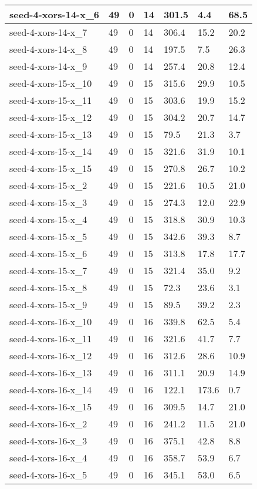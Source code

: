 \begin{scriptsize}
\begin{longtable}{|p{5cm}|l|l|l|l|l|l|}
seed-4-xors-14-x\_6&49&0&14&301.5&4.4&68.5 \\ \hline 
seed-4-xors-14-x\_7&49&0&14&306.4&15.2&20.2 \\ \hline 
seed-4-xors-14-x\_8&49&0&14&197.5&7.5&26.3 \\ \hline 
seed-4-xors-14-x\_9&49&0&14&257.4&20.8&12.4 \\ \hline 
seed-4-xors-15-x\_10&49&0&15&315.6&29.9&10.5 \\ \hline 
seed-4-xors-15-x\_11&49&0&15&303.6&19.9&15.2 \\ \hline 
seed-4-xors-15-x\_12&49&0&15&304.2&20.7&14.7 \\ \hline 
seed-4-xors-15-x\_13&49&0&15&79.5&21.3&3.7 \\ \hline 
seed-4-xors-15-x\_14&49&0&15&321.6&31.9&10.1 \\ \hline 
seed-4-xors-15-x\_15&49&0&15&270.8&26.7&10.2 \\ \hline 
seed-4-xors-15-x\_2&49&0&15&221.6&10.5&21.0 \\ \hline 
seed-4-xors-15-x\_3&49&0&15&274.3&12.0&22.9 \\ \hline 
seed-4-xors-15-x\_4&49&0&15&318.8&30.9&10.3 \\ \hline 
seed-4-xors-15-x\_5&49&0&15&342.6&39.3&8.7 \\ \hline 
seed-4-xors-15-x\_6&49&0&15&313.8&17.8&17.7 \\ \hline 
seed-4-xors-15-x\_7&49&0&15&321.4&35.0&9.2 \\ \hline 
seed-4-xors-15-x\_8&49&0&15&72.3&23.6&3.1 \\ \hline 
seed-4-xors-15-x\_9&49&0&15&89.5&39.2&2.3 \\ \hline 
seed-4-xors-16-x\_10&49&0&16&339.8&62.5&5.4 \\ \hline 
seed-4-xors-16-x\_11&49&0&16&321.6&41.7&7.7 \\ \hline 
seed-4-xors-16-x\_12&49&0&16&312.6&28.6&10.9 \\ \hline 
seed-4-xors-16-x\_13&49&0&16&311.1&20.9&14.9 \\ \hline 
seed-4-xors-16-x\_14&49&0&16&122.1&173.6&0.7 \\ \hline 
seed-4-xors-16-x\_15&49&0&16&309.5&14.7&21.0 \\ \hline 
seed-4-xors-16-x\_2&49&0&16&241.2&11.5&21.0 \\ \hline 
seed-4-xors-16-x\_3&49&0&16&375.1&42.8&8.8 \\ \hline 
seed-4-xors-16-x\_4&49&0&16&358.7&53.9&6.7 \\ \hline 
seed-4-xors-16-x\_5&49&0&16&345.1&53.0&6.5 \\ \hline 

\end{longtable}
\end{scriptsize}
